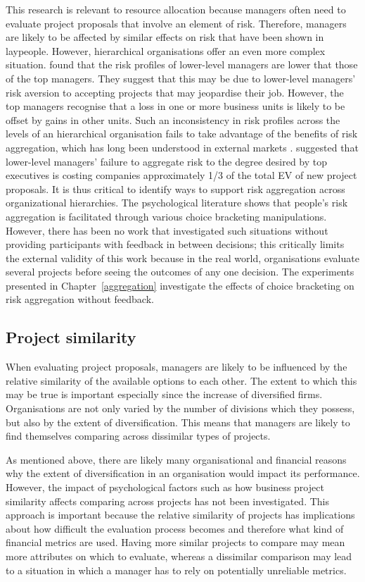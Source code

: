 \documentclass[a4paper, nobind, dvipsnames]{templates/ociamthesis}
\theoremstyle{definition}
\theoremstyle{definition}
\theoremstyle{definition}
\theoremstyle{definition}
\theoremstyle{remark}
\begin{document}
This research is relevant to resource allocation because managers often need to
evaluate project proposals that involve an element of risk. Therefore, managers
are likely to be affected by similar effects on risk that have been shown in
laypeople. However, hierarchical organisations offer an even more complex
situation. \textcite{lovallo2020} found that the risk profiles of lower-level managers are
lower that those of the top managers. They suggest that this may be due to
lower-level managers' risk aversion to accepting projects that may jeopardise
their job. However, the top managers recognise that a loss in one or more
business units is likely to be offset by gains in other units. Such an
inconsistency in risk profiles across the levels of an hierarchical organisation
fails to take advantage of the benefits of risk aggregation, which has long been
understood in external markets \autocite{markowitz1952}. \textcite{lovallo2020} suggested that
lower-level managers' failure to aggregate risk to the degree desired by top
executives is costing companies approximately 1/3 of the total EV of new project
proposals. It is thus critical to identify ways to support risk aggregation
across organizational hierarchies. The psychological literature shows that
people's risk aggregation is facilitated through various choice bracketing
manipulations. However, there has been no work that investigated such situations
without providing participants with feedback in between decisions; this
critically limits the external validity of this work because in the real world,
organisations evaluate several projects before seeing the outcomes of any one
decision. The experiments presented in Chapter~\ref{aggregation} investigate
the effects of choice bracketing on risk aggregation without feedback.

\subsection{Project similarity}

When evaluating project proposals, managers are likely to be influenced by the
relative similarity of the available options to each other. The extent to which
this may be true is important especially since the increase of diversified
firms. Organisations are not only varied by the number of divisions which they
possess, but also by the extent of diversification. This means that managers are
likely to find themselves comparing across dissimilar types of projects.

As mentioned above, there are likely many organisational and financial reasons
why the extent of diversification in an organisation would impact its
performance. However, the impact of psychological factors such as how business
project similarity affects comparing across projects has not been investigated.
This approach is important because the relative similarity of projects has
implications about how difficult the evaluation process becomes and therefore
what kind of financial metrics are used. Having more similar projects to compare
may mean more attributes on which to evaluate, whereas a dissimilar comparison
may lead to a situation in which a manager has to rely on potentially unreliable
metrics.
\end{document}

